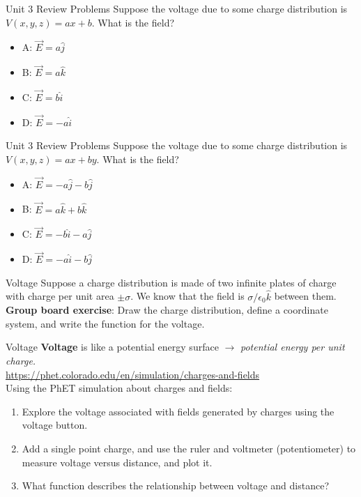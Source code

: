 \documentclass{beamer}
\begin{document}
\begin{frame}{Unit 3 Review Problems}
Suppose the voltage due to some charge distribution is $V(x,y,z) = ax+b$.  What is the field?
\begin{itemize}
\item A: $\vec{E} = a\hat{j}$
\item B: $\vec{E} = a\hat{k}$
\item C: $\vec{E} = b\hat{i}$
\item D: $\vec{E} = -a\hat{i}$
\end{itemize}
\end{frame}

\begin{frame}{Unit 3 Review Problems}
Suppose the voltage due to some charge distribution is $V(x,y,z) = ax+by$.  What is the field?
\begin{itemize}
\item A: $\vec{E} = -a\hat{j}-b\hat{j}$
\item B: $\vec{E} = a\hat{k}+b\hat{k}$
\item C: $\vec{E} = -b\hat{i}-a\hat{j}$
\item D: $\vec{E} = -a\hat{i}-b\hat{j}$
\end{itemize}
\end{frame}

\begin{frame}{Voltage}
Suppose a charge distribution is made of two infinite plates of charge with charge per unit area $\pm\sigma$.  We know that the field is $\sigma/\epsilon_0 \hat{k}$ between them.  \textbf{Group board exercise}: Draw the charge distribution, define a coordinate system, and write the function for the voltage.
\end{frame}

\begin{frame}{Voltage}
\textbf{Voltage} is like a potential energy surface $\rightarrow$ \textit{potential energy per unit charge.} \\ \vspace{0.5cm}
\url{https://phet.colorado.edu/en/simulation/charges-and-fields} \\
\alert{Using the PhET simulation about charges and fields}:
\begin{enumerate}
\item Explore the voltage associated with fields generated by charges using the voltage button.
\item Add a single point charge, and use the ruler and voltmeter (potentiometer) to measure voltage versus distance, and plot it.
\item What function describes the relationship between voltage and distance?
\end{enumerate}
\end{frame}
\end{document}
